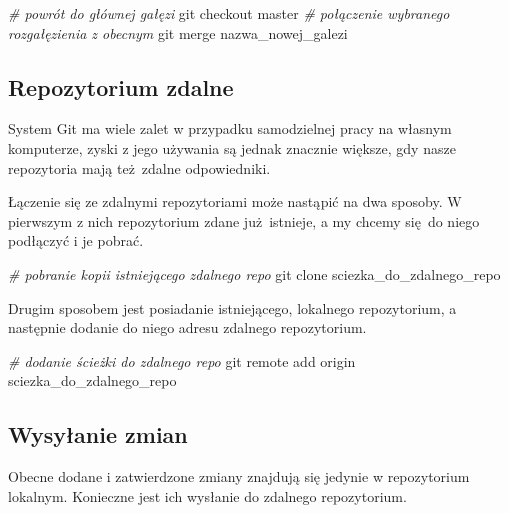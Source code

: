 \documentclass[paper=6in:9in,pagesize=pdftex,headinclude=on,footinclude=on,10pt]{scrbook}
\newenvironment{Shaded}{\begin{snugshade}}{\end{snugshade}}
\newcommand{\CommentTok}[1]{\textcolor[rgb]{0.56,0.35,0.01}{\textit{#1}}}
\newcommand{\FunctionTok}[1]{\textcolor[rgb]{0.00,0.00,0.00}{#1}}
\newcommand{\NormalTok}[1]{#1}
\begin{document}
\begin{Shaded}
\begin{Highlighting}[]
\CommentTok{# powrót do głównej gałęzi}
\FunctionTok{git}\NormalTok{ checkout master}
\CommentTok{# połączenie wybranego rozgałęzienia z obecnym}
\FunctionTok{git}\NormalTok{ merge nazwa_nowej_galezi}
\end{Highlighting}
\end{Shaded}

\hypertarget{repozytorium-zdalne}{%
\subsection{Repozytorium zdalne}\label{repozytorium-zdalne}}

System Git ma wiele zalet w przypadku samodzielnej pracy na własnym komputerze, zyski z jego używania są jednak znacznie większe, gdy nasze repozytoria mają też~zdalne odpowiedniki.

Łączenie się ze zdalnymi repozytoriami może nastąpić na dwa sposoby.
W pierwszym z nich repozytorium zdane już~istnieje, a my chcemy się~do niego podłączyć i je pobrać.

\begin{Shaded}
\begin{Highlighting}[]
\CommentTok{# pobranie kopii istniejącego zdalnego repo}
\FunctionTok{git}\NormalTok{ clone sciezka_do_zdalnego_repo}
\end{Highlighting}
\end{Shaded}

Drugim sposobem jest posiadanie istniejącego, lokalnego repozytorium, a następnie dodanie do niego adresu zdalnego repozytorium.

\begin{Shaded}
\begin{Highlighting}[]
\CommentTok{# dodanie ścieżki do zdalnego repo}
\FunctionTok{git}\NormalTok{ remote add origin sciezka_do_zdalnego_repo}
\end{Highlighting}
\end{Shaded}

\hypertarget{wysylanie-zmian}{%
\subsection{Wysyłanie zmian}\label{wysylanie-zmian}}

Obecne dodane i zatwierdzone zmiany znajdują się jedynie w repozytorium lokalnym.
Konieczne jest ich wysłanie do zdalnego repozytorium.
\end{document}
